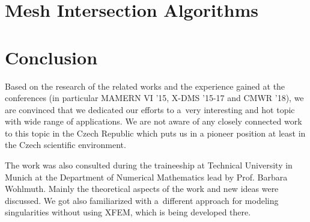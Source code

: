 \documentclass[bibliography=totocnumbered,dvipsnames,FM,Dis,EN]{tulthesis}
\begin{document}

\chapter{Mesh Intersection Algorithms} \label{chap:intersections}







\chapter{Conclusion} \label{chap:summary}


Based on the research of the related works and the experience gained at the conferences
(in particular MAMERN VI '15, X-DMS '15-17 and CMWR '18),
we are convinced that we dedicated our efforts to a~very interesting and hot topic with wide range of applications.
We are not aware of any closely connected work to this topic in the Czech Republic
which puts us in a pioneer position at least in the Czech scientific environment.



The work was also consulted during the traineeship at Technical University in Munich at the Department of Numerical Mathematics
lead by Prof. Barbara Wohlmuth. Mainly the theoretical aspects of the work and new ideas were discussed.
We got also familiarized with a~different approach for modeling singularities without using XFEM, which is being developed there.


\end{document}
